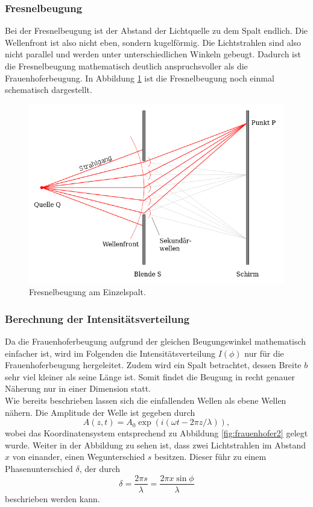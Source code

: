 \subsubsection*{Fresnelbeugung}
Bei der Fresnelbeugung ist der Abstand der Lichtquelle zu dem Spalt endlich. Die Wellenfront ist also nicht eben, sondern kugelförmig. Die Lichtstrahlen sind also
nicht parallel und werden unter unterschiedlichen Winkeln gebeugt. Dadurch ist die Fresnelbeugung mathematisch deutlich anspruchsvoller als die Frauenhoferbeugung.
In Abbildung \ref{fig:fresnel} ist die Fresnelbeugung noch einmal schematisch dargestellt.
\begin{figure}[H]
    \centering
    \includegraphics[scale = 0.45]{pictures/fresnel.png}
    \caption{Fresnelbeugung am Einzelspalt. \cite{AP02}}
    \label{fig:fresnel}
\end{figure}
\noindent

\subsubsection*{Berechnung der Intensitätsverteilung}
\label{sec:intensität}
Da die Frauenhoferbeugung aufgrund der gleichen Beugungswinkel mathematisch einfacher ist, wird im Folgenden die Intensitätsverteilung $I(\phi)$
nur für die Frauenhoferbeugung hergeleitet. Zudem wird ein Spalt betrachtet, dessen Breite $b$ sehr viel kleiner als seine Länge ist. Somit findet
die Beugung in recht genauer Näherung nur in einer Dimension statt.
\\\noindent
Wie bereits beschrieben lassen sich die einfallenden Wellen als ebene Wellen nähern. Die Amplitude der Welle ist gegeben durch
\begin{equation*}
    A(z,t)=A_0\exp{(i(\omega t-2\pi z/\lambda))}    ,
    \label{eqn:ebenewelle}
\end{equation*}
wobei das Koordinatensystem entsprechend zu Abbildung \ref{fig:frauenhofer2} gelegt wurde. Weiter in der Abbildung zu sehen ist, dass zwei
Lichtstrahlen im Abstand $x$ von einander, einen Wegunterschied $s$ besitzen. Dieser führ zu einem Phasenunterschied $\delta$, der durch
\begin{equation*}
    \delta=\frac{2\pi s}{\lambda}=\frac{2\pi x \sin{\phi}}{\lambda}
    \label{eqn:phase}
\end{equation*}
beschrieben werden kann.

